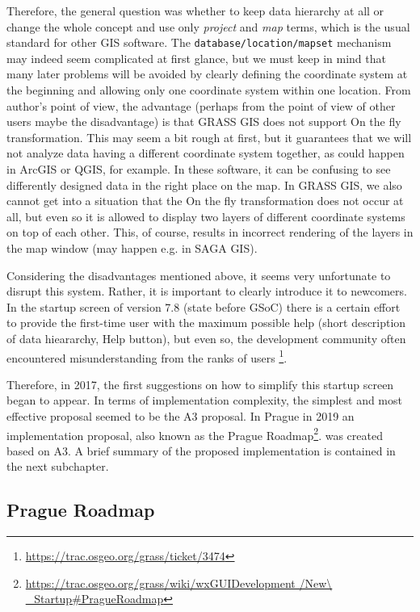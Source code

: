 \documentclass[a4paper,10pt,twoside]{article}
\begin{document}
Therefore, the general question was whether to keep data hierarchy at all or change the whole concept and use only \textit{project} and \textit{map} terms, which is the usual standard for other GIS software. The \texttt {database/location/mapset} mechanism may indeed seem complicated at first glance, but we must keep in mind that many later problems will be avoided by clearly defining the coordinate system at the beginning and allowing only one coordinate system within one location. From author’s point of view, the advantage (perhaps from the point of view of other users maybe the disadvantage) is that GRASS GIS does not support On the fly transformation. This may seem a bit rough at first, but it guarantees that we will not analyze data having a different coordinate system together, as could happen in ArcGIS or QGIS, for example. In these software, it can be confusing to see differently designed data in the right place on the map. In GRASS GIS, we also cannot get into a situation that the On the fly transformation does not occur at all, but even so it is allowed to display two layers of different coordinate systems on top of each other. This, of course, results in incorrect rendering of the layers in the map window (may happen e.g. in SAGA GIS).

Considering the disadvantages mentioned above, it seems very unfortunate to disrupt this system. Rather, it is important to clearly introduce it to newcomers. In the startup screen of version 7.8 (state before GSoC) there is a certain effort to provide the first-time user with the maximum possible help (short description of data hieararchy, Help button), but even so, the development community often encountered misunderstanding from the ranks of users \footnote{\url{https://trac.osgeo.org/grass/ticket/3474}}. 

Therefore, in 2017, the first suggestions on how to simplify this startup screen began to appear. In terms of implementation complexity, the simplest and most effective proposal seemed to be the A3 proposal. In Prague in 2019 an implementation proposal, also known as the Prague Roadmap\footnote{\url{https://trac.osgeo.org/grass/wiki/wxGUIDevelopment /New\ _Startup\#PragueRoadmap}}.  was created based on A3. A brief summary of the proposed implementation is contained in the next subchapter.

\newpage
\vspace*{-1cm}
\subsection{Prague Roadmap}
\label{section:Prague Roadmap}
\end{document}

